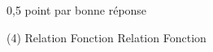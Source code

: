 %
%
    0,5 point par bonne réponse
    \begin{tasks}(4)
        \task Relation
        \task Fonction
        \task Relation
        \task Fonction
    \end{tasks}
